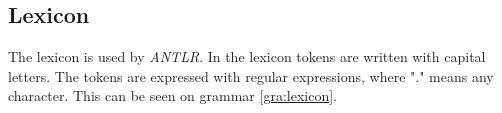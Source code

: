 \subsection{Lexicon}
The lexicon is used by \textit{ANTLR}. In the lexicon tokens are written with capital letters. The tokens are expressed with regular expressions, where "." means any character. This can be seen on grammar \ref{gra:lexicon}.